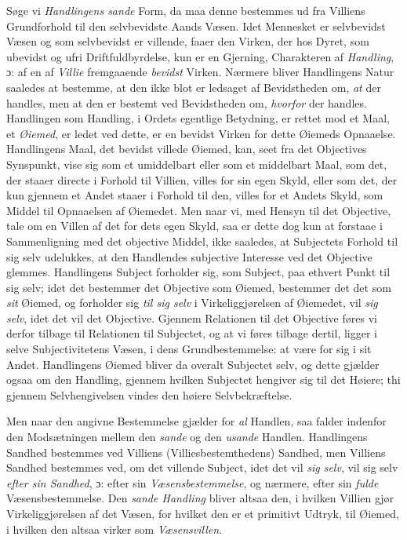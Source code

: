 Søge vi \emph{Handlingens sande} Form, da maa denne bestemmes ud fra Villiens
Grundforhold til den selvbevidste Aands Væsen. Idet Mennesket er selvbevidst
Væsen og som selvbevidst er villende, faaer den Virken, der hos Dyret, som
ubevidst og ufri Driftfuldbyrdelse, kun er en
 Gjerning, Charakteren af \emph{Handling}, ɔ: af en af \emph{Villie} fremgaaende
\emph{bevidst} Virken. Nærmere bliver Handlingens Natur saaledes at bestemme, at
den ikke blot er ledsaget af Bevidstheden om, \emph{at} der handles, men at den
er bestemt ved Bevidstheden om, \emph{hvorfor} der handles. Handlingen som
Handling, i Ordets egentlige Betydning, er rettet mod et Maal, et
\emph{Øiemed}, er ledet ved dette, er en bevidst Virken for dette Øiemeds
Opnaaelse. Handlingens Maal, det bevidst villede Øiemed, kan, seet fra det
Objectives Synspunkt, vise sig som et umiddelbart eller som et middelbart Maal,
som det, der staaer directe i Forhold til Villien, villes for sin egen Skyld,
eller som det, der kun gjennem et Andet staaer i Forhold til den, villes for et
Andets Skyld, som Middel til Opnaaelsen af Øiemedet. Men naar vi, med Hensyn til
det Objective, tale om en Villen af det for dets egen Skyld, saa er dette dog
kun at forstaae i Sammenligning med det objective Middel, ikke saaledes, at
Subjectets Forhold til sig selv udelukkes, at den Handlendes subjective
Interesse ved det Objective glemmes. Handlingens Subject forholder sig, som
Subject, paa ethvert Punkt til sig selv; idet det bestemmer det Objective som
Øiemed, bestemmer det det som \emph{sit} Øiemed, og forholder sig \emph{til sig
selv} i Virkeliggjørelsen af Øiemedet, vil \emph{sig selv}, idet det vil det
Objective. Gjennem Relationen til det Objective føres vi derfor tilbage til
Relationen til Subjectet, og at vi føres tilbage dertil, ligger i selve
Subjectivitetens Væsen, i dens Grundbestemmelse: at være for sig i sit Andet.
Handlingens Øiemed bliver da overalt Subjectet selv, og dette gjælder ogsaa om
den Handling, gjennem hvilken Subjectet hengiver sig til det Høiere; thi gjennem
Selvhengivelsen vindes den høiere Selvbekræftelse.

Men naar den angivne Bestemmelse gjælder for \emph{al} Handlen, saa falder
indenfor den Modsætningen mellem den \emph{sande} og den \emph{usande} Handlen.
Handlingens Sandhed bestemmes ved Villiens (Villiesbestemthedens) Sandhed, men
Villiens Sandhed bestemmes ved, om det villende Subject, idet det vil \emph{sig
selv}, vil sig selv \emph{efter sin Sandhed},
 ɔ: efter sin \emph{Væsensbestemmelse}, og nærmere, efter sin \emph{fulde}
Væsensbestemmelse. Den \emph{sande Handling} bliver altsaa den, i hvilken
Villien gjør Virkeliggjørelsen af det Væsen, for hvilket den er et primitivt
Udtryk, til Øiemed, i hvilken den altsaa virker som \emph{Væsensvillen}.

